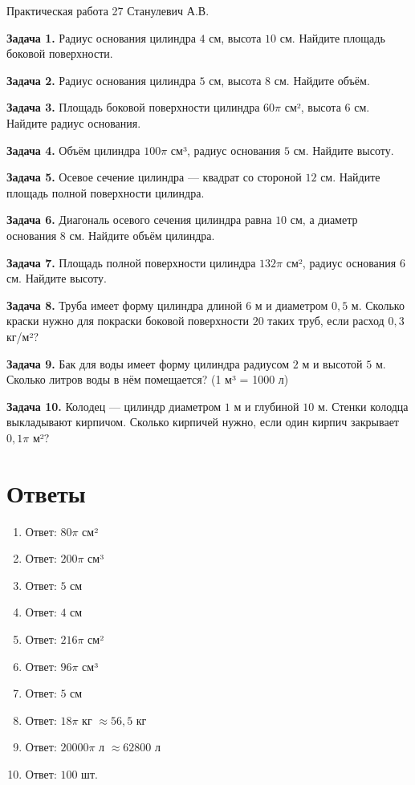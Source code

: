 \documentclass{umk-matematika}
\begin{document}
\maketitlepage
    {Практическая работа 27}
    {}
    {Станулевич А.В.}

\textbf{Задача 1.} Радиус основания цилиндра $4$ см, высота $10$ см. Найдите площадь боковой поверхности.\par\vspace{10pt}
\textbf{Задача 2.} Радиус основания цилиндра $5$ см, высота $8$ см. Найдите объём.\par\vspace{10pt}
\textbf{Задача 3.} Площадь боковой поверхности цилиндра $60\pi$ см², высота $6$ см. Найдите радиус основания.\par\vspace{10pt}
\textbf{Задача 4.} Объём цилиндра $100\pi$ см³, радиус основания $5$ см. Найдите высоту.\par\vspace{10pt}
\textbf{Задача 5.} Осевое сечение цилиндра — квадрат со стороной $12$ см. Найдите площадь полной поверхности цилиндра.\par\vspace{10pt}
\textbf{Задача 6.} Диагональ осевого сечения цилиндра равна $10$ см, а диаметр основания $8$ см. Найдите объём цилиндра.\par\vspace{10pt}
\textbf{Задача 7.} Площадь полной поверхности цилиндра $132\pi$ см², радиус основания $6$ см. Найдите высоту.\par\vspace{10pt}
\textbf{Задача 8.} Труба имеет форму цилиндра длиной $6$ м и диаметром $0{,}5$ м. Сколько краски нужно для покраски боковой поверхности $20$ таких труб, если расход $0{,}3$ кг/м²?\par\vspace{10pt}
\textbf{Задача 9.} Бак для воды имеет форму цилиндра радиусом $2$ м и высотой $5$ м. Сколько литров воды в нём помещается? (1 м³ = 1000 л)\par\vspace{10pt}
\textbf{Задача 10.} Колодец — цилиндр диаметром $1$ м и глубиной $10$ м. Стенки колодца выкладывают кирпичом. Сколько кирпичей нужно, если один кирпич закрывает $0{,}1\pi$ м²?\par\vspace{10pt}
\newpage
\section*{Ответы}

\begin{enumerate}
  \item Ответ: $80\pi$ см²
  \item Ответ: $200\pi$ см³
  \item Ответ: $5$ см
  \item Ответ: $4$ см
  \item Ответ: $216\pi$ см²
  \item Ответ: $96\pi$ см³
  \item Ответ: $5$ см
  \item Ответ: $18\pi$ кг $\approx 56{,}5$ кг
  \item Ответ: $20000\pi$ л $\approx 62800$ л
  \item Ответ: $100$ шт.
\end{enumerate}
\end{document}
